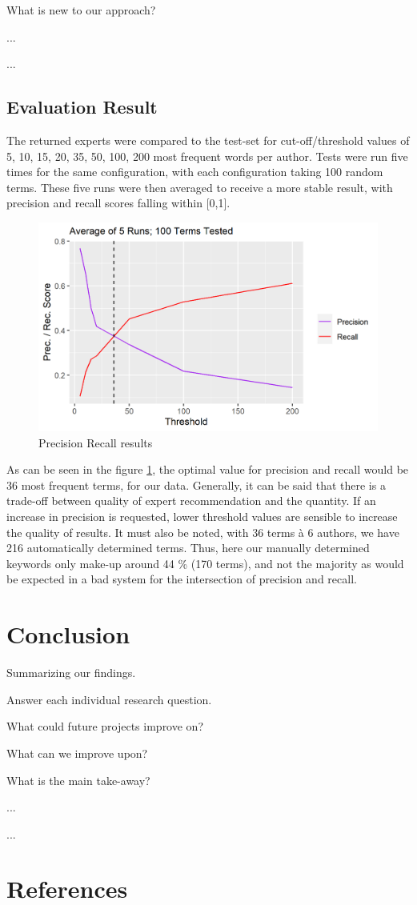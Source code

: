 \documentclass[a4paper,12pt]{article}
\begin{document}
What is new to our approach?

...

...

\subsection{Evaluation Result}
The returned experts were compared to the test-set for cut-off/threshold values of 5, 10, 15, 20, 35, 50, 100, 200 most frequent words per author. 
Tests were run five times for the same configuration, with each configuration taking 100 random terms.
These five runs were then averaged to receive a more stable result, with precision and recall scores falling within [0,1].

\begin{figure}[h]
    \begin{center}
        \includegraphics[width=\linewidth]{figs/precision_recall.png}
        \caption{Precision Recall results}
    \end{center}
    \label{fig:evaluation}
\end{figure}


As can be seen in the figure \ref{fig:evaluation}, the optimal value for precision and recall would be 36 most frequent terms, for our data.
Generally, it can be said that there is a trade-off between quality of expert recommendation and the quantity.
If an increase in precision is requested, lower threshold values are sensible to increase the quality of results.
It must also be noted, with 36 terms à 6 authors, we have 216 automatically determined terms. 
Thus, here our manually determined keywords only make-up around 44 \% (170 terms), and not the majority as would be expected in a bad system for the intersection of precision and recall.


\section{Conclusion} %
Summarizing our findings.

Answer each individual research question.

What could future projects improve on?

What can we improve upon?

What is the main take-away?

...

...

\section{References}



\end{document}
